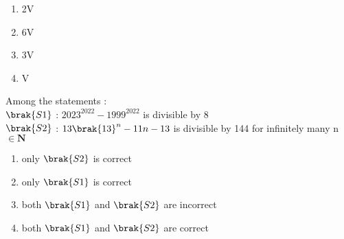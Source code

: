     \begin{multicols}{4} 
    \begin{enumerate}
        \item 2V
        \item 6V
        \item 3V
        \item V
    \end{enumerate} 
    \end{multicols}
\item Among the statements : \\
    $\brak{S1}$ : $2023^{2022}-1999^{2022}$ is divisible by $8$ \\
    $\brak{S2}$ : $13\brak{13}^{n}-11n-13$ is divisible by 144 for infinitely many n $\in \mathbf{N}$
    \begin{multicols}{2}
    \begin{enumerate}
        \item only $\brak{S2}$ is correct
        \item only $\brak{S1}$ is correct
        \item both $\brak{S1}$ and $\brak{S2}$ are incorrect
        \item both $\brak{S1}$ and $\brak{S2}$ are correct
    \end{enumerate} 
    \end{multicols}
